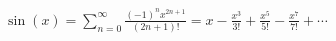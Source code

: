 \documentclass[preview]{standalone}
\begin{document}
\begin{align*}
\sin(x) = \sum_{n=0}^{\infty} \frac{(-1)^n x^{2n+1}}{(2n+1)!} = x-\frac{x^3}{3!}+\frac{x^5}{5!}-\frac{x^7}{7!}+\cdots
\end{align*}
\end{document}
